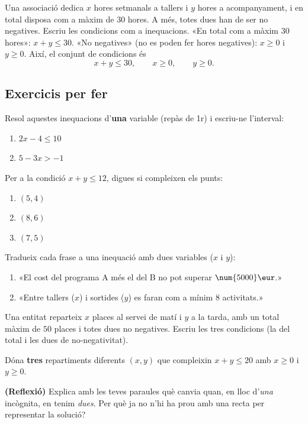 \begin{exresolt}
Una associació dedica $x$ hores setmanals a tallers i $y$ hores a acompanyament, i en
total disposa com a màxim de $30$ hores. A més, totes dues han de ser no negatives.
Escriu les condicions com a inequacions.
\solucio
«En total com a màxim $30$ hores»: $x+y\le 30$. «No negatives» (no es poden fer hores
negatives): $x\ge 0$ i $y\ge 0$. Així, el conjunt de condicions és
\[
x+y\le 30,\qquad x\ge 0,\qquad y\ge 0.
\]
\end{exresolt}

\subsection{Exercicis per fer}

\begin{exercicis}
\begin{exlist}
  \item Resol aquestes inequacions d'\textbf{una} variable (repàs de 1r) i escriu-ne
        l'interval:
        \begin{enumerate}[label=\alph*), leftmargin=1.6em, topsep=2pt]
          \item $2x-4\le 10$ \hfill \item $5-3x>-1$
        \end{enumerate}
  \item Per a la condició $x+y\le 12$, digues si compleixen els punts:
        \begin{enumerate}[label=\alph*), leftmargin=1.6em, topsep=2pt]
          \item $(5,4)$ \hfill \item $(8,6)$ \hfill \item $(7,5)$
        \end{enumerate}
  \item Tradueix cada frase a una inequació amb dues variables ($x$ i $y$):
        \begin{enumerate}[label=\alph*), leftmargin=1.6em, topsep=2pt]
          \item «El cost del programa A més el del B no pot superar $\num{5000}\eur$.»
          \item «Entre tallers ($x$) i sortides ($y$) es faran com a mínim $8$ activitats.»
        \end{enumerate}
  \item Una entitat reparteix $x$ places al servei de matí i $y$ a la tarda, amb un
        total màxim de $50$ places i totes dues no negatives. Escriu les tres
        condicions (la del total i les dues de no-negativitat).
  \item Dóna \textbf{tres} repartiments diferents $(x,y)$ que compleixin
        $x+y\le 20$ amb $x\ge 0$ i $y\ge 0$.
  \item \textbf{(Reflexió)} Explica amb les teves paraules què canvia quan, en lloc
        d'\emph{una} incògnita, en tenim \emph{dues}. Per què ja no n'hi ha prou amb
        una recta per representar la solució?
\end{exlist}
\end{exercicis}

